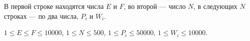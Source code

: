 В первой строке находятся числа $E$ и $F$, во второй --- число $N$,
в следующих $N$ строках --- по два числа, $P_i$ и
$W_i$.

$1 \le E \le F \le 10000$,
$1 \le N \le 500$,
$1 \le P_i \le 50000$,
$1 \le W_i \le 10000$.
